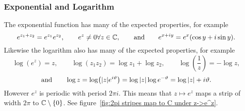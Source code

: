 \documentclass{article}
\begin{document}
    \subsubsection{Exponential and Logarithm}
    The exponential function has many of the expected properties, for example
    \[e^{z_1 + z_2} = e^{z_1}e^{z_2},\qquad  e^{z}\ne 0 \forall z\in\mathbb{C}, \qquad\text{and}\qquad e^{x + iy} = e^x(\cos y + i\sin y).\]
    Likewise the logarithm also has many of the expected properties, for example
    \[\log(e^z) = z, \qquad \log(z_1z_2) = \log z_1 + \log z_2, \qquad \log\left(\frac{1}{z}\right) = -\log z,\]
    \[\text{and}\qquad \log z = \log(\abs{z}e^{i\vartheta}) = \log\abs{z} \log e^{-\vartheta} = \log\abs{z} + i\vartheta.\]
    However \(e^z\) is periodic with period \(2\pi i\).
    This means that \(z\mapsto e^z\) maps a strip of width \(2\pi\) to \(\mathbb{C}\setminus\{0\}\).
    See figure~\ref{fig:2pi stripes map to C under z->e^z}.
\end{document}
